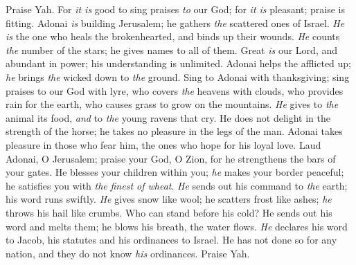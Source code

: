 \begin{biblechapter} %
 Praise Yah. 
For \textit{it is} good to sing praises \textit{to} our God; 
for \textit{it is} pleasant; praise is fitting.
\verse Adonai \textit{is} building Jerusalem; 
he gathers \textit{the} scattered ones of Israel.
\verse \textit{He is} the one who heals the brokenhearted, 
and binds up their wounds.
\verse \textit{He} counts \textit{the} number of the stars; 
he gives names to all of them.
\verse Great \textit{is} our Lord, and abundant in power; 
his understanding is unlimited.
\verse Adonai helps the afflicted up; 
\textit{he} brings \textit{the} wicked down to \textit{the} ground.
\verse Sing to Adonai with thanksgiving; 
sing praises to our God with lyre,
\verse who covers \textit{the} heavens with clouds, 
who provides rain for the earth, 
who causes grass to grow on the mountains.
\verse \textit{He} gives to \textit{the} animal its food, 
\textit{and} to \textit{the} young ravens that cry.
\verse He does not delight in the strength of the horse; 
he takes no pleasure in the legs of the man.
\verse Adonai takes pleasure in those who fear him, 
the ones who hope for his loyal love.
\verse Laud Adonai, O Jerusalem; 
praise your God, O Zion,
\verse for he strengthens the bars of your gates. 
He blesses your children within you;
\verse \textit{he} makes your border peaceful; 
he satisfies you with \textit{the} \textit{finest of wheat}.
\verse \textit{He} sends out his command to \textit{the} earth; 
his word runs swiftly.
\verse \textit{He} gives snow like wool; 
he scatters frost like ashes;
\verse \textit{he} throws his hail like crumbs. 
Who can stand before his cold?
\verse He sends out his word and melts them; 
he blows his breath, the water flows.
\verse \textit{He} declares his word to Jacob, 
his statutes and his ordinances to Israel.
\verse He has not done so for any nation, 
and they do not know \textit{his} ordinances. 
Praise Yah.
\end{biblechapter}


